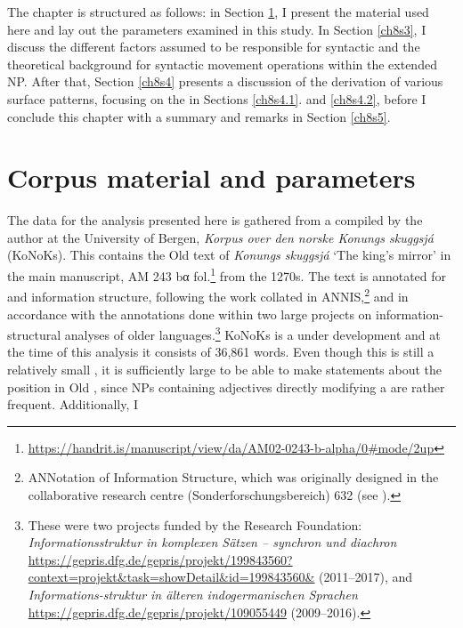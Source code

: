\documentclass[output=paper,colorlinks,citecolor=brown]{langscibook}
\begin{document}
The chapter is structured as follows: in Section \ref{ch8s2}, I present the 
material used here and lay out the parameters examined in this study. In
Section \ref{ch8s3}, I discuss the different factors assumed to be responsible for
syntactic  and the theoretical background for syntactic
movement operations within the extended NP. After that, Section \ref{ch8s4}
presents a discussion of the derivation of various surface patterns,
focusing on the  in Sections \ref{ch8s4.1}. and \ref{ch8s4.2}, before I
conclude this chapter with a summary and remarks in Section \ref{ch8s5}.



\section{Corpus material and parameters}\label{ch8s2}
The data for the analysis presented here is gathered from a 
compiled by the author at the University of Bergen, \nocite{KoNoKs} \textit{Korpus over den norske Konungs skuggsjá} (KoNoKs). This  contains the Old  text of
\emph{Konungs skuggsjá} `The king's mirror' in the  main manuscript, AM 243 bα fol.\footnote{\url{https://handrit.is/manuscript/view/da/AM02-0243-b-alpha/0\#mode/2up}}
from the 1270s. The text is annotated for  and information
structure, following the work collated in ANNIS,\footnote{ANNotation of
  Information Structure, which was originally designed in the  collaborative research centre (Sonderforschungsbereich) 632
  (see \citealp{KrauseZelde16}).} and in accordance with the annotations
done within two large projects on information-structural analyses of
older languages.\footnote{These were two projects funded by the  Research Foundation:
  \textit{Informationsstruktur in komplexen Sätzen -- synchron und diachron}
  \url{https://gepris.dfg.de/gepris/projekt/199843560?context=projekt\&task=showDetail\&id=199843560\&}
  (2011--2017), and \textit{Informations-struktur in älteren indogermanischen
  Sprachen} \url{https://gepris.dfg.de/gepris/projekt/109055449}
  (2009--2016).} KoNoKs is a  under development and at the time of
this analysis it consists of 36,861 words. Even though this is still a
relatively small , it is sufficiently large to be able to make statements about the
 position in Old , since NPs containing adjectives
directly modifying a  are rather frequent. Additionally, I
\end{document}
